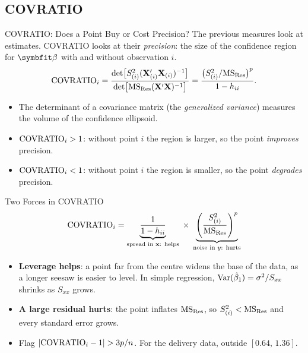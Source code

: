 \subsection{COVRATIO}


\begin{frame}{COVRATIO: Does a Point Buy or Cost Precision?}
    The previous measures look at estimates. COVRATIO looks at their \emph{precision}: the size of the confidence region for $\bbeta$ with and without observation $i$.
    \[
    \mathrm{COVRATIO}_i=\frac{\det\bigl[S_{(i)}^2(\mathbf{X}_{(i)}'\mathbf{X}_{(i)})^{-1}\bigr]}{\det\bigl[\mathrm{MS}_{\mathrm{Res}}(\mathbf{X}'\mathbf{X})^{-1}\bigr]}
    =\frac{\bigl(S_{(i)}^2/\mathrm{MS}_{\mathrm{Res}}\bigr)^p}{1-h_{ii}} .
    \]
    \begin{itemize}
        \item The determinant of a covariance matrix (the \emph{generalized variance}) measures the volume of the confidence ellipsoid.
        \item $\mathrm{COVRATIO}_i>1$: without point $i$ the region is larger, so the point \emph{improves} precision.
        \item $\mathrm{COVRATIO}_i<1$: without point $i$ the region is smaller, so the point \emph{degrades} precision.
    \end{itemize}
\end{frame}


\begin{frame}{Two Forces in COVRATIO}
    \[
    \mathrm{COVRATIO}_i=\underbrace{\frac{1}{1-h_{ii}}}_{\text{spread in }\mathbf{x}\text{: helps}}\;\times\;\underbrace{\left(\frac{S_{(i)}^2}{\mathrm{MS}_{\mathrm{Res}}}\right)^p}_{\text{noise in }y\text{: hurts}}
    \]
    \begin{itemize}
        \item \textbf{Leverage helps}: a point far from the centre widens the base of the data, as a longer seesaw is easier to level. In simple regression, $\operatorname{Var}(\hat\beta_1)=\sigma^2/S_{xx}$ shrinks as $S_{xx}$ grows.
        \item \textbf{A large residual hurts}: the point inflates $\mathrm{MS}_{\mathrm{Res}}$, so $S_{(i)}^2<\mathrm{MS}_{\mathrm{Res}}$ and every standard error grows.
        \item Flag $|\COVRATIO_i-1|>3p/n$. For the delivery data, outside $[0.64,\,1.36]$.
    \end{itemize}
\end{frame}


